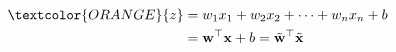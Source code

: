 \documentclass[preview]{standalone}
\begin{document}
\begin{align}
\textcolor{ORANGE}{z} &= w_1 x_1 + w_2 x_2 + \dots + w_n x_n + b \\ &= \mathbf{w}^\top \mathbf{x} + b = \tilde{\mathbf{w}}^\top \tilde{\mathbf{x}}
\end{align}
\end{document}
